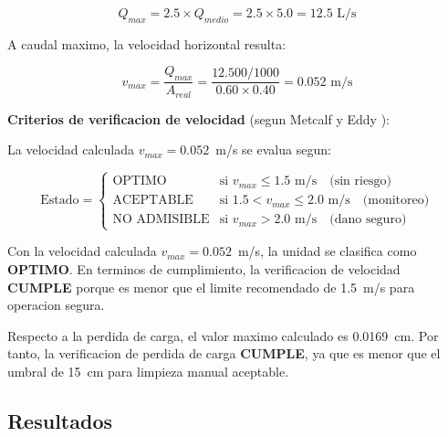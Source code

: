 \documentclass[12pt,a4paper]{article}
\newcommand{\captionequation}[1]{}  %
\begin{document}
\begin{equation}
Q_{{max}} = 2.5 \times Q_{{medio}} = 2.5 \times 5.0 = 12.5 \text{ L/s}
\end{equation}

A caudal maximo, la velocidad horizontal resulta:

\begin{equation}
v_{{max}} = \frac{Q_{{max}}}{A_{{real}}} = \frac{12.500/1000}{0.60 \times 0.40} = 0.052 \text{ m/s}
\end{equation}

\textbf{Criterios de verificacion de velocidad} (segun Metcalf y Eddy \cite{metcalf2014}):

La velocidad calculada $v_{{max}} = 0.052$~m/s se evalua segun:

\begin{equation}
\text{Estado} = \begin{cases}
    \text{OPTIMO} & \text{si } v_{{max}} \leq 1.5 \text{ m/s} \quad \text{(sin riesgo)} \\
    \text{ACEPTABLE} & \text{si } 1.5 < v_{{max}} \leq 2.0 \text{ m/s} \quad \text{(monitoreo)} \\
    \text{NO ADMISIBLE} & \text{si } v_{{max}} > 2.0 \text{ m/s} \quad \text{(dano seguro)}
\end{cases}
\end{equation}
\captionequation{Criterios de verificacion de velocidad en rejillas}

Con la velocidad calculada $v_{{max}} = 0.052$~m/s, la unidad se clasifica como \textbf{OPTIMO}. En terminos de cumplimiento, la verificacion de velocidad \textbf{CUMPLE} porque es menor que el limite recomendado de 1.5~m/s para operacion segura.

Respecto a la perdida de carga, el valor maximo calculado es 0.0169~cm. Por tanto, la verificacion de perdida de carga \textbf{CUMPLE}, ya que es menor que el umbral de 15~cm para limpieza manual aceptable.

\subsection{Resultados}
\end{document}
